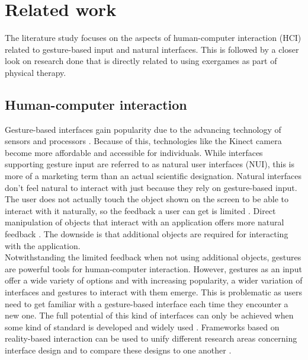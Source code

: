\chapter{Related work}
\label{chapter: related work}

The literature study focuses on the aspects of human-computer interaction (HCI) related to gesture-based input and natural interfaces. This is followed by a closer look on research done that is directly related to using exergames as part of physical therapy.


\section{Human-computer interaction}

Gesture-based interfaces gain popularity due to the advancing technology of sensors and processors \cite{Jacob2008}. Because of this, technologies like the Kinect camera become more affordable and accessible for individuals. While interfaces supporting gesture input are referred to as natural user interfaces (NUI), this is more of a marketing term than an actual scientific designation. Natural interfaces don't feel natural to interact with just because they rely on gesture-based input. The user does not actually touch the object shown on the screen to be able to interact with it naturally, so the feedback a user can get is limited \cite{Norman2010}. Direct manipulation of objects that interact with an application offers more natural feedback \cite{Shneiderman2010}. The downside is that additional objects are required for interacting with the application.\\

Notwithstanding the limited feedback when not using additional objects, gestures are powerful tools for human-computer interaction. However, gestures as an input offer a wide variety of options and with increasing popularity, a wider variation of interfaces and gestures to interact with them emerge. This is problematic as users need to get familiar with a gesture-based interface each time they encounter a new one. The full potential of this kind of interfaces can only be achieved when some kind of standard is developed and widely used \cite{Norman2010}. Frameworks based on reality-based interaction can be used to unify different research areas concerning interface design and to compare these designs to one another \cite{Jacob2008}.\\

